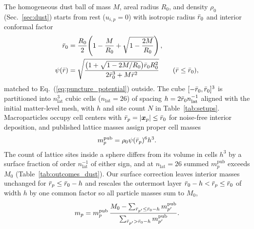 The homogeneous dust ball of mass $M$, areal radius $R_0$, and density $\rho_0$ (Sec.~\ref{sec:dust}) starts from rest ($u_{i,p}=0$) with isotropic radius $\bar{r}_0$ and interior conformal factor \cite{Staley:2011ss}
\begin{align}\label{eq:app_dust_psi}
\bar{r}_0&=\frac{R_0}{2}\!\left(1-\frac{M}{R_0}+\sqrt{1-\frac{2M}{R_0}}\right),\nonumber\\
\psi(\bar{r})&=\sqrt{\frac{\bigl(1+\sqrt{1-2M/R_0}\bigr)\bar{r}_0R_0^2}{2\bar{r}_0^3+M\bar{r}^2}}\qquad(\bar{r}\le\bar{r}_0),
\end{align}
matched to Eq.~(\ref{eq:puncture_potential}) outside. The cube $[-\bar{r}_0,\bar{r}_0]^3$ is partitioned into $n_{\mathrm{lat}}^3$ cubic cells ($n_{\mathrm{lat}}=26$) of spacing $h=2\bar{r}_0n_{\mathrm{lat}}^{-1}$ aligned with the initial matter-level mesh, with $h$ and site count $N$ in Table~\ref{tab:setups}. Macroparticles occupy cell centers with $\bar{r}_p=|\bm{x}_p|\le\bar{r}_0$ for noise-free interior deposition, and published lattice masses \cite{Wu:2026nrpic} assign proper cell masses
\begin{equation}\label{eq:app_dust_published}
m_p^{\mathrm{pub}}=\rho_0\psi(\bar{r}_p)^6h^3.
\end{equation}
The count of lattice sites inside a sphere differs from its volume in cells $h^3$ by a surface fraction of order $n_{\mathrm{lat}}^{-1}$ of either sign, and at $n_{\mathrm{lat}}=26$ summed $m_p^{\mathrm{pub}}$ exceeds $M_0$ (Table~\ref{tab:outcomes_dust}). Our surface correction leaves interior masses unchanged for $\bar{r}_p\le\bar{r}_0-h$ and rescales the outermost layer $\bar{r}_0-h<\bar{r}_p\le\bar{r}_0$ of width $h$ by one common factor so all particle masses sum to $M_0$,
\begin{equation}\label{eq:app_dust_surface}
m_p=m_p^{\mathrm{pub}}\,\frac{M_0-\sum_{\bar{r}_{p'}\le\bar{r}_0-h}m_{p'}^{\mathrm{pub}}}{\sum_{\bar{r}_{p'}>\bar{r}_0-h}m_{p'}^{\mathrm{pub}}}.
\end{equation}

